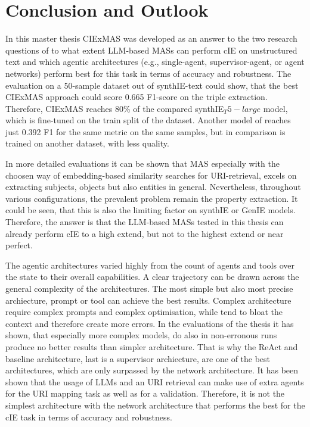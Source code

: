 \documentclass[a4paper,oneside,bibliography=totoc]{scrbook}
\begin{document}
\chapter{Conclusion and Outlook}
\label{ch:conclusion_outlook}

In this master thesis CIExMAS was developed as an answer to the two research questions of to what extent \ac{LLM}-based \acp{MAS} can perform \ac{cIE} on unstructured text and which agentic architectures (e.g., single-agent, supervisor-agent, or agent networks) perform best for this task in terms of accuracy and robustness. The evaluation on a 50-sample dataset out of synthIE-text could show, that the best CIExMAS approach could score 0.665 F1-score on the triple extraction. Therefore, CIExMAS reaches 80\% of the compared synthIE${_T5-large}$ model, which is fine-tuned on the train split of the dataset. Another model of \citet{Josifoski2021} reaches just 0.392 F1 for the same metric on the same samples, but in comparison is trained on another dataset, with less quality.

In more detailed evaluations it can be shown that MAS especially with the choosen way of embedding-based similarity searches for URI-retrieval, excels on extracting subjects, objects but also entities in general. Nevertheless, throughout various configurations, the prevalent problem remain the property extraction. It could be seen, that this is also the limiting factor on synthIE or GenIE models. Therefore, the answer is that the \ac{LLM}-based \acp{MAS} tested in this thesis can already perform \ac{cIE} to a high extend, but not to the highest extend or near perfect.

The agentic architectures varied highly from the count of agents and tools over the state to their overall capabilities. A clear trajectory can be drawn across the general complexity of the architectures. The most simple but also most precise archiecture, prompt or tool can achieve the best results. Complex architecture require complex prompts and complex optimisation, while tend to bloat the context and therefore create more errors. In the evaluations of the thesis it has shown, that especially more complex models, do also in non-erronous runs produce no better results than simpler architecture. That is why the ReAct and baseline architecture, last is a supervisor archiecture, are one of the best architectures, which are only surpassed by the network architecture. It has been shown that the usage of \acp{LLM} and an URI retrieval can make use of extra agents for the URI mapping task as well as for a validation. Therefore, it is not the simplest architecture with the network architecture that performs the best for the \ac{cIE} task in terms of accuracy and robustness.
\end{document}
